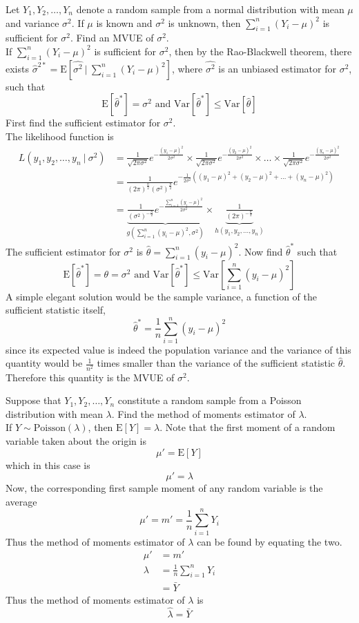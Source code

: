 \documentclass[12pt]{article}
\newcommand{\ques}[1]{\noindent {\bf Question #1: }}
\newcommand{\expe}[1]{\text{E}\left[ #1 \right]}
\renewcommand{\var}[1]{\text{Var}\left[ #1 \right]}
\begin{document}
\newpage
\ques{9.56} Let $Y_1,Y_2,\dots,Y_n$ denote a random sample from a normal distribution with mean $\mu$ and variance $\sigma^2$. If $\mu$ is known and $\sigma^2$ is unknown, then $\sum_{i=1}^n (Y_i - \mu)^2$ is sufficient for $\sigma^2$. Find an MVUE of $\sigma^2$. \\
If $\sum_{i=1}^n (Y_i - \mu)^2$ is sufficient for $\sigma^2$, then by the Rao-Blackwell theorem, there exists $\hat{\sigma}^{2*} = \expe{\hat{\sigma^2} ~|~ \sum_{i=1}^n (Y_i - \mu)^2} $, where $\hat{\sigma^2}$ is an unbiased estimator for $\sigma^2$, such that $$ \expe{\hat{\theta}^*} = \sigma^2 \text{ and } \var{\hat{\theta}^*} \leq \var{\hat{\theta}} $$ First find the sufficient estimator for $\sigma^2$. \\ The likelihood function is $$ \begin{aligned} L(y_1,y_2,\dots,y_n ~|~ \sigma^2) &= \frac{1}{\sqrt{2\pi \sigma^2}} e^{-\frac{(y_1 - \mu)^2}{2\sigma^2}} \times \frac{1}{\sqrt{2\pi \sigma^2}} e^{-\frac{(y_2 - \mu)^2}{2\sigma^2}} \times \dots \times \frac{1}{\sqrt{2\pi \sigma^2}} e^{-\frac{(y_n - \mu)^2}{2\sigma^2}}\\ &= \frac{1}{(2\pi)^{\frac{n}{2}} (\sigma^2)^{\frac{n}{2}}}e^{-\frac{1}{2\sigma^2}((y_1 - \mu)^2 + (y_2 - \mu)^2 + \dots + (y_n - \mu)^2)} \\ &= \underbrace{\frac{1}{(\sigma^2)^{-\frac{n}{2}}} e^{-\frac{\sum_{i=1}^n (y_i - \mu)^2}{2\sigma^2}}}_{g\left( \sum_{i=1}^n (y_i - \mu)^2, \sigma^2\right)} \times \underbrace{\frac{1}{(2\pi)^{-\frac{n}{2}}}}_{h(y_1,y_2,\dots,y_n)} \end{aligned} $$ 
The sufficient estimator for $\sigma^2$ is $\hat{\theta} = \sum_{i=1}^n (y_i - \mu)^2$. Now find $\hat{\theta}^*$ such that $$\expe{\hat{\theta}^*} = \theta = \sigma^2 \text{ and } \var{\hat{\theta}^*} \leq \var{\sum_{i=1}^n (y_i - \mu)^2} $$ 
A simple elegant solution would be the sample variance, a function of the sufficient statistic itself, $$ \hat{\theta}^* = \frac{1}{n} \sum_{i=1}^n (y_i - \mu)^2 $$ since its expected value is indeed the population variance and the variance of this quantity would be $\frac{1}{n^2}$ times smaller than the variance of the sufficient statistic $\hat{\theta}$. Therefore this quantity is the MVUE of $\sigma^2$.

\newpage
\ques{9.70} Suppose that $Y_1,Y_2,\dots,Y_n$ constitute a random sample from a Poisson distribution with mean $\lambda$. Find the method of moments estimator of $\lambda$. \\
If $Y \sim \text{Poisson}(\lambda)$, then $ \expe{Y} = \lambda $. Note that the first moment of a random variable taken about the origin is $$ \mu' = \expe{Y} $$ which in this case is $$ \mu' = \lambda $$ 
Now, the corresponding first sample moment of any random variable is the average $$ \mu' = m' = \frac{1}{n}\sum_{i=1}^n Y_i $$ Thus the method of moments estimator of $\lambda$ can be found by equating the two. $$ \begin{aligned} \mu' &= m' \\ \lambda &= \frac{1}{n} \sum_{i=1}^n Y_i \\ &= \bar{Y} \end{aligned} $$ Thus the method of moments estimator of $\lambda$ is $$ \hat{\lambda} = \bar{Y} $$ 
\end{document}
